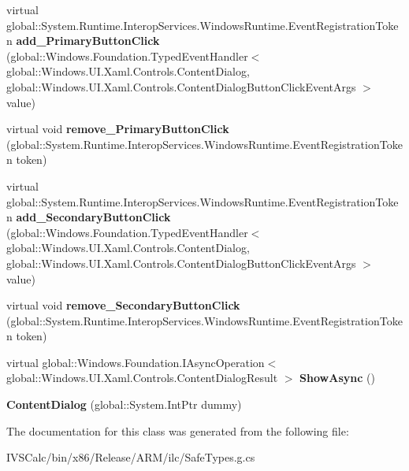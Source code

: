 \begin{DoxyCompactItemize}
virtual global\+::\+System.\+Runtime.\+Interop\+Services.\+Windows\+Runtime.\+Event\+Registration\+Token {\bfseries add\+\_\+\+Primary\+Button\+Click} (global\+::\+Windows.\+Foundation.\+Typed\+Event\+Handler$<$ global\+::\+Windows.\+U\+I.\+Xaml.\+Controls.\+Content\+Dialog, global\+::\+Windows.\+U\+I.\+Xaml.\+Controls.\+Content\+Dialog\+Button\+Click\+Event\+Args $>$ value)
\item 
\mbox{\label{class_windows_1_1_u_i_1_1_xaml_1_1_controls_1_1_content_dialog_ad87d51f3f0f3f6e07586f13e8912c5dc}} 
virtual void {\bfseries remove\+\_\+\+Primary\+Button\+Click} (global\+::\+System.\+Runtime.\+Interop\+Services.\+Windows\+Runtime.\+Event\+Registration\+Token token)
\item 
\mbox{\label{class_windows_1_1_u_i_1_1_xaml_1_1_controls_1_1_content_dialog_aa769bea5ba29f6714032e97410b15b2f}} 
virtual global\+::\+System.\+Runtime.\+Interop\+Services.\+Windows\+Runtime.\+Event\+Registration\+Token {\bfseries add\+\_\+\+Secondary\+Button\+Click} (global\+::\+Windows.\+Foundation.\+Typed\+Event\+Handler$<$ global\+::\+Windows.\+U\+I.\+Xaml.\+Controls.\+Content\+Dialog, global\+::\+Windows.\+U\+I.\+Xaml.\+Controls.\+Content\+Dialog\+Button\+Click\+Event\+Args $>$ value)
\item 
\mbox{\label{class_windows_1_1_u_i_1_1_xaml_1_1_controls_1_1_content_dialog_a3dfa1680cb30bf0dc1f3402bc879912e}} 
virtual void {\bfseries remove\+\_\+\+Secondary\+Button\+Click} (global\+::\+System.\+Runtime.\+Interop\+Services.\+Windows\+Runtime.\+Event\+Registration\+Token token)
\item 
\mbox{\label{class_windows_1_1_u_i_1_1_xaml_1_1_controls_1_1_content_dialog_acc6835ff256e59954bab47b9ce049071}} 
virtual global\+::\+Windows.\+Foundation.\+I\+Async\+Operation$<$ global\+::\+Windows.\+U\+I.\+Xaml.\+Controls.\+Content\+Dialog\+Result $>$ {\bfseries Show\+Async} ()
\item 
\mbox{\label{class_windows_1_1_u_i_1_1_xaml_1_1_controls_1_1_content_dialog_ac5cd215d832532c7377d5d28dc7c9e2f}} 
{\bfseries Content\+Dialog} (global\+::\+System.\+Int\+Ptr dummy)
\end{DoxyCompactItemize}


The documentation for this class was generated from the following file\+:\begin{DoxyCompactItemize}
\item 
I\+V\+S\+Calc/bin/x86/\+Release/\+A\+R\+M/ilc/Safe\+Types.\+g.\+cs\end{DoxyCompactItemize}
